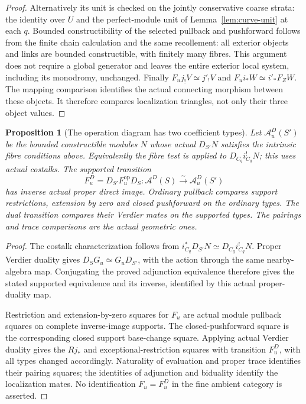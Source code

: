 \documentclass[11pt]{article}
\newtheorem{proposition}[theorem]{Proposition}
\theoremstyle{definition}
\theoremstyle{remark}
\begin{document}
\begin{proof}
Alternatively its unit is checked on the jointly conservative coarse
strata: the identity over $U$ and the perfect-module unit of
Lemma~\ref{lem:curve-unit} at each $q$.  Bounded constructibility of
the selected pullback and pushforward follows from the finite chain
calculation and the same recollement: all exterior objects and links
are bounded constructible, with finitely many fibres.  This argument
does not require a global generator and leaves the entire exterior
local system, including its monodromy, unchanged.
Finally $F_uj_!V\simeq j'_!V$ and $F_ui_*W\simeq i'_*F_ZW$.
The mapping comparison identifies the actual connecting morphism
between these objects.  It therefore compares localization triangles,
not only their three object values.
\end{proof}

\begin{proposition}[The operation diagram has two coefficient types]
\label{prop:typed-modification}
Let $\mathcal A_u^D(S')$ be the bounded constructible modules $N$
whose actual $D_{S'}N$ satisfies the intrinsic fibre conditions above.
Equivalently the fibre test is applied to $D_{C_q}i_{C_q}^!N$;
this uses actual costalks.  The supported transition
\[
 F_u^D=D_{S'}F_u^{\mathrm{op}}D_S
 :\mathcal A^D(S)\xrightarrow{\sim}\mathcal A_u^D(S')
\]
has inverse actual proper direct image.  Ordinary pullback compares
support restrictions, extension by zero and closed pushforward on
the ordinary types.  The dual transition compares their Verdier
mates on the supported types.  The pairings and trace comparisons
are the actual geometric ones.
\end{proposition}
\begin{proof}
The costalk characterization follows from
$i_{C_q}^*D_{S'}N\simeq D_{C_q}i_{C_q}^!N$.
Proper Verdier duality gives $D_SG_u\simeq G_uD_{S'}$,
with the action through the same nearby-algebra map.  Conjugating
the proved adjunction equivalence therefore gives the stated
supported equivalence and its inverse, identified by this actual
proper-duality map.

Restriction and extension-by-zero squares for $F_u$ are actual
module pullback squares on complete inverse-image supports.
The closed-pushforward square is the corresponding closed support
base-change square.  Applying actual Verdier duality gives the
$Rj_*$ and exceptional-restriction squares with transition $F_u^D$,
with all types changed accordingly.  Naturality of evaluation and
proper trace identifies their pairing squares; the identities of
adjunction and biduality identify the localization mates.
No identification $F_u=F_u^D$ in the fine ambient category is asserted.
\end{proof}
\end{document}
